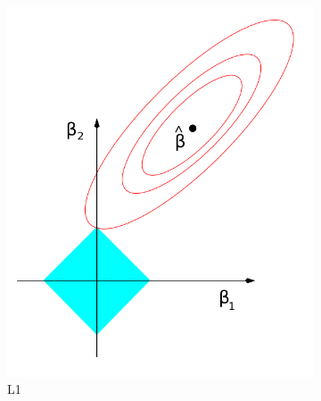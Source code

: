 \begin{figure}
  \centering
  \begin{subfigure}[b]{0.48\textwidth}\centering
      \includegraphics[width=\textwidth]{figures/ml/l1.png}
  \caption{L1}
  \label{fig:ml:l1l2:l1}
  \end{subfigure}
  ~
  \begin{subfigure}[b]{0.48\textwidth}\centering

\end{subfigure}
\end{figure}
